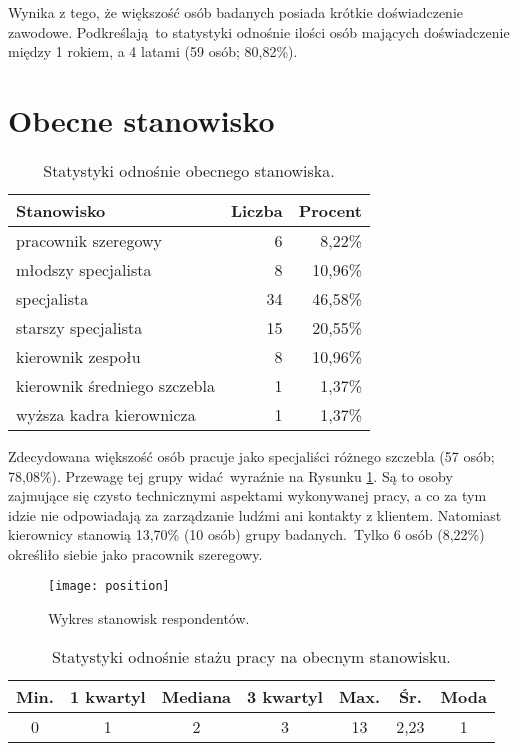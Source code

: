 Wynika z tego, że większość osób badanych posiada krótkie doświadczenie zawodowe. Podkreślają to statystyki odnośnie ilości osób mających doświadczenie między 1 rokiem, a 4 latami (59 osób; 80,82\%).

\section{Obecne stanowisko}

\begin{table}[h!]
\begin{center}
\begin{tabular}{l r r}
Stanowisko & Liczba & Procent \\ \hline
pracownik szeregowy & 6 & 8,22\% \\
młodszy specjalista & 8 & 10,96\% \\
specjalista & 34 & 46,58\% \\
starszy specjalista & 15 & 20,55\% \\
kierownik zespołu & 8 & 10,96\% \\
kierownik średniego szczebla & 1 & 1,37\% \\
wyższa kadra kierownicza & 1 & 1,37\% \\
\end{tabular}
\end{center}
\caption{Statystyki odnośnie obecnego stanowiska.}
\label{tab:position-stats}
\end{table}

Zdecydowana większość osób pracuje jako specjaliści różnego szczebla (57 osób; 78,08\%). Przewagę tej grupy widać wyraźnie na Rysunku \ref{fig:position}. Są to osoby zajmujące się czysto technicznymi aspektami wykonywanej pracy, a co za tym idzie nie odpowiadają za zarządzanie ludźmi ani kontakty z klientem. Natomiast kierownicy stanowią 13,70\% (10 osób) grupy badanych. Tylko 6 osób (8,22\%) określiło siebie jako pracownik szeregowy.

\begin{figure}[h]
\begin{center}
\texttt{[image: position]}
\end{center}
\caption{Wykres stanowisk respondentów.}
\label{fig:position}
\end{figure}

\begin{table}[h!]
\begin{center}
\begin{tabular}{c c c c c c c}
Min. & 1 kwartyl & Mediana & 3 kwartyl & Max. & Śr. & Moda \\ \hline
0 & 1 & 2 & 3 & 13 & 2,23 & 1 \\
\end{tabular}
\end{center}
\caption{Statystyki odnośnie stażu pracy na obecnym stanowisku.}
\label{tab:position-years-stats}
\end{table}

